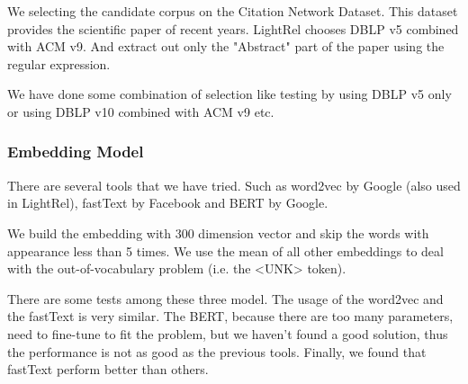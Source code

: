We selecting the candidate corpus on the Citation Network Dataset. This dataset provides the scientific paper of recent years. LightRel chooses DBLP  v5 combined with ACM v9. And extract out only the "Abstract" part of the paper using the regular expression.

We have done some combination of selection like testing by using DBLP v5 only or using DBLP v10 combined with ACM v9 etc.

\subsubsection{Embedding Model}

There are several tools that we have tried. Such as word2vec by Google (also used in LightRel), fastText by Facebook and BERT by Google.

We build the embedding with 300 dimension vector and skip the words with appearance less than 5 times. We use the mean of all other embeddings to deal with the out-of-vocabulary problem (i.e. the <UNK> token).

There are some tests among these three model. The usage of the word2vec and the fastText is very similar. The BERT, because there are too many parameters, need to fine-tune to fit the problem, but we haven't found a good solution, thus the performance is not as good as the previous tools. Finally, we found that fastText perform better than others.